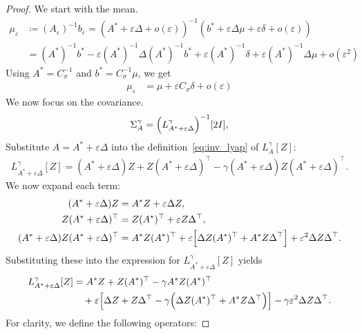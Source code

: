 \documentclass[10pt,a4paper]{amsart}
\newcommand{\eqdef}{\coloneqq}
\begin{document}
\begin{proof}
We start with the mean. 
 \begin{align*}
 \mu_\varepsilon &\eqdef (A_\varepsilon)^{-1}b_\varepsilon = \left( A^* + \varepsilon \Delta + o(\varepsilon) \right)^{-1} (b^* + \varepsilon\Delta\mu + \varepsilon \delta + o(\varepsilon)) \\
 &= (A^*)^{-1}b^* - \varepsilon (A^*)^{-1} \Delta (A^*)^{-1} b^* + \varepsilon (A^*)^{-1} \delta  + \varepsilon (A^*)^{-1} \Delta \mu + o(\varepsilon^2)
 \end{align*}
Using $A^* = C_\sigma^{-1}$ and $b^* = C_\sigma^{-1} \mu$, we get 
  \begin{align*}
 \mu_\varepsilon &= \mu + \varepsilon C_\sigma  \delta  + o(\varepsilon)
 \end{align*}
We now focus on the covariance.
 \begin{align*}
\Sigma^\gamma_{A} = \Bigl(L^\gamma_{A^*+\varepsilon\Delta}\Bigr)^{-1}[2I],
\end{align*}
Substitute $A = A^* + \varepsilon\Delta$ into the definition~\eqref{eq:inv_lyap} of $L^\gamma_A[Z]$:
 \begin{align*}
L^\gamma_{A^*+\varepsilon\Delta}[Z] = (A^*+\varepsilon\Delta)Z + Z(A^*+\varepsilon\Delta)^\top - \gamma  (A^*+\varepsilon\Delta)Z (A^*+\varepsilon\Delta)^\top.
 \end{align*}
We now expand each term:
 \begin{align*}
\begin{aligned}
(A^*+\varepsilon\Delta)Z &= A^* Z + \varepsilon   \Delta Z,\\
Z(A^*+\varepsilon\Delta)^\top &= Z (A^*)^\top + \varepsilon   Z \Delta^\top,\\
(A^*+\varepsilon\Delta) Z (A^*+\varepsilon\Delta)^\top 
&= A^*Z (A^*)^\top + \varepsilon\Bigl[\Delta Z (A^*)^\top + A^*Z \Delta^\top\Bigr] + \varepsilon^2   \Delta Z \Delta^\top.
\end{aligned}
 \end{align*}
Substituting these into the expression for $L^\gamma_{A^*+\varepsilon\Delta}[Z]$ yields
 \begin{align*}
L^\gamma_{A^*+\varepsilon\Delta}[Z] &= A^*Z + Z (A^*)^\top - \gamma   A^*Z (A^*)^\top\\ \nonumber
&\quad {}+ \varepsilon\Bigl[\Delta Z + Z \Delta^\top - \gamma\Bigl(\Delta Z (A^*)^\top + A^*Z \Delta^\top\Bigr)\Bigr] - \gamma  \varepsilon^2   \Delta Z \Delta^\top.
 \end{align*}
For clarity, we define the following operators:

\end{proof}
\end{document}
